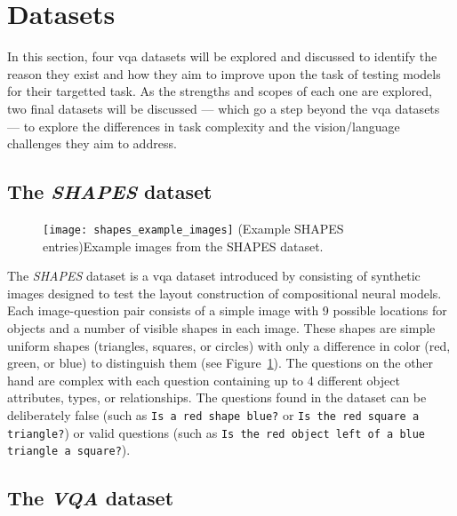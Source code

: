 \graphicspath{{content/chapters/literature_review/datasets/figures}}

\section{Datasets}
\label{sec:datasets}

In this section, four \gls{vqa} datasets will be explored and discussed to identify the reason they exist and how they aim to improve upon the task of testing models for their targetted task.
As the strengths and scopes of each one are explored, two final datasets will be discussed --- which go a step beyond the \gls{vqa} datasets --- to explore the differences in task complexity and the vision/language challenges they aim to address.

\subsection{The \textit{SHAPES} dataset}
\label{subsec:shapes_dataset}

\begin{figure}[htbp]
    \centering
    \texttt{[image: shapes\_example\_images]}
    \captionsource(Example SHAPES entries){Example images from the SHAPES dataset. \label{fig:shapes_example_images}}{\citeauthor{andreas_neural_2016}\cite{andreas_neural_2016}}
\end{figure}

The \textit{SHAPES} dataset is a \gls{vqa} dataset introduced by \citeauthor{andreas_deep_2016} \cite{andreas_deep_2016} consisting of synthetic images designed to test the layout construction of compositional neural models.
Each image-question pair consists of a simple image with 9 possible locations for objects and a number of visible shapes in each image.
These shapes are simple uniform shapes (triangles, squares, or circles) with only a difference in color  (red, green, or blue) to distinguish them (see Figure~\ref{fig:shapes_example_images}).
The questions on the other hand are complex with each question containing up to 4 different object attributes, types, or relationships.
The questions found in the dataset can be deliberately false (such as \texttt{Is a red shape blue?} or \texttt{Is the red square a triangle?}) or valid questions (such as \texttt{Is the red object left of a blue triangle a square?}).

\subsection{The \textit{VQA} dataset}
\label{subsec:vqa_dataset}

